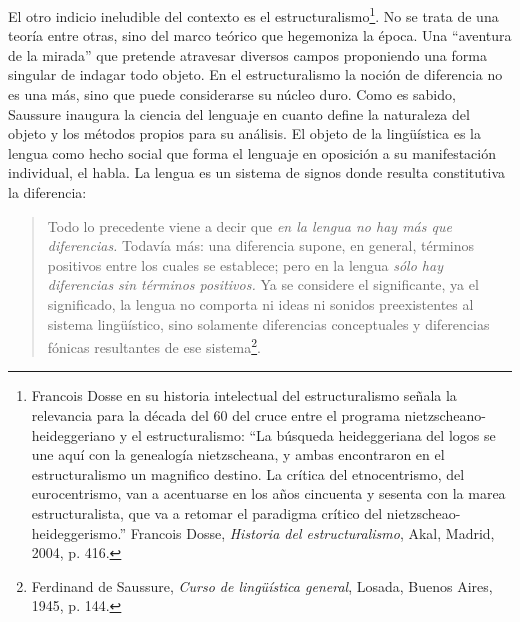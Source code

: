 \documentclass{book}
\begin{document}
El otro indicio ineludible del contexto es el
estructuralismo\footnote{Francois Dosse en su historia intelectual del
  estructuralismo señala la relevancia para la década del 60 del cruce
  entre el programa nietzscheano-heideggeriano y el estructuralismo: \enquote{La
  búsqueda heideggeriana del logos se une aquí con la genealogía
  nietzscheana, y ambas encontraron en el estructuralismo un magnifico
  destino. La crítica del etnocentrismo, del eurocentrismo, van a
  acentuarse en los años cincuenta y sesenta con la marea
  estructuralista, que va a retomar el paradigma crítico del
  nietzscheao-heideggerismo.} Francois Dosse, \emph{Historia del
  estructuralismo}, Akal, Madrid, 2004, p. 416.}. No se trata de una
teoría entre otras, sino del marco teórico que hegemoniza la época. Una
\enquote{aventura de la mirada} que pretende atravesar diversos campos
proponiendo una forma singular de indagar todo objeto. En el
estructuralismo la noción de diferencia no es una más, sino que puede
considerarse su núcleo duro. Como es sabido, Saussure inaugura la
ciencia del lenguaje en cuanto define la naturaleza del objeto y los
métodos propios para su análisis. El objeto de la lingüística es la
lengua como hecho social que forma el lenguaje en oposición a su
manifestación individual, el habla. La lengua es un sistema de signos
donde resulta constitutiva la diferencia:

\begin{quote}
Todo lo precedente viene a decir que \emph{en la lengua no hay más que
diferencias.} Todavía más: una diferencia supone, en general, términos
positivos entre los cuales se establece; pero en la lengua \emph{sólo
hay diferencias sin términos positivos.} Ya se considere el
significante, ya el significado, la lengua no comporta ni ideas ni
sonidos preexistentes al sistema lingüístico, sino solamente diferencias
conceptuales y diferencias fónicas resultantes de ese
sistema\footnote{Ferdinand de Saussure, \emph{Curso de lingüística
  general}, Losada, Buenos Aires, 1945, p. 144.}.
\end{quote}
\end{document}
